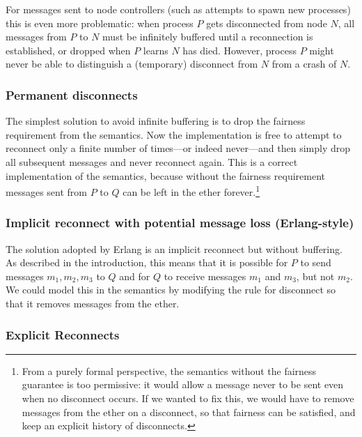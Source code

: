 \documentclass[10pt]{article}
\begin{document}
For messages sent to node controllers (such as attempts to spawn new processes)
this is even more problematic: when process $P$ gets disconnected from node
$N$, all messages from $P$ to $N$ must be infinitely buffered until a
reconnection is established, or dropped when $P$ learns $N$ has died. However,
process $P$ might never be able to distinguish a (temporary) disconnect from
$N$ from a crash of $N$. 

\subsubsection*{Permanent disconnects}

The simplest solution to avoid infinite buffering is to drop the fairness
requirement from the semantics.  Now the implementation is free to attempt to
reconnect only a finite number of times---or indeed never---and then simply
drop all subsequent messages and never reconnect again.  This is a correct
implementation of the semantics, because without the fairness requirement
messages sent from $P$ to $Q$ can be left in the ether forever.\footnote{From a
purely formal perspective, the semantics without the fairness guarantee is too
permissive: it would allow a message never to be sent even when no disconnect
occurs. If we wanted to fix this, we would have to remove messages from the
ether on a disconnect, so that fairness can be satisfied, and keep an explicit
history of disconnects.} 

\subsubsection*{Implicit reconnect with potential message loss (Erlang-style)}

The solution adopted by Erlang is an implicit reconnect but without
buffering. As described in the introduction, this means that it is possible for
$P$ to send messages $m_1, m_2, m_3$ to $Q$ and for $Q$ to receive messages
$m_1$ and $m_3$, but not $m_2$.  We could model this in the semantics by
modifying the rule for disconnect so that it removes messages from the ether.

\subsubsection*{Explicit Reconnects}
\end{document}
